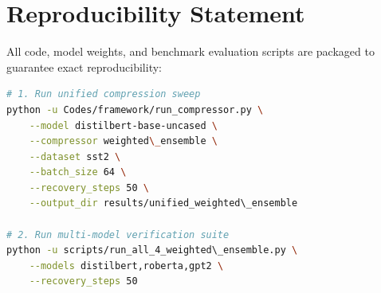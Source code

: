 \section{Reproducibility Statement}
All code, model weights, and benchmark evaluation scripts are packaged to guarantee exact reproducibility:
\begin{lstlisting}[language=bash]
# 1. Run unified compression sweep
python -u Codes/framework/run_compressor.py \
    --model distilbert-base-uncased \
    --compressor weighted\_ensemble \
    --dataset sst2 \
    --batch_size 64 \
    --recovery_steps 50 \
    --output_dir results/unified_weighted\_ensemble

# 2. Run multi-model verification suite
python -u scripts/run_all_4_weighted\_ensemble.py \
    --models distilbert,roberta,gpt2 \
    --recovery_steps 50
\end{lstlisting}
